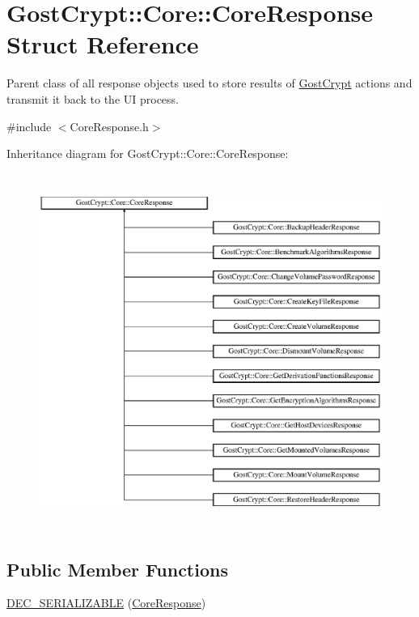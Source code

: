 \hypertarget{struct_gost_crypt_1_1_core_1_1_core_response}{}\section{Gost\+Crypt\+:\+:Core\+:\+:Core\+Response Struct Reference}
\label{struct_gost_crypt_1_1_core_1_1_core_response}


Parent class of all response objects used to store results of \hyperlink{namespace_gost_crypt}{Gost\+Crypt} actions and transmit it back to the UI process.  




{\ttfamily \#include $<$Core\+Response.\+h$>$}

Inheritance diagram for Gost\+Crypt\+:\+:Core\+:\+:Core\+Response\+:\begin{figure}[H]
\begin{center}
\leavevmode
\includegraphics[height=11.666667cm]{struct_gost_crypt_1_1_core_1_1_core_response}
\end{center}
\end{figure}
\subsection*{Public Member Functions}
\begin{DoxyCompactItemize}
\item 
\hyperlink{struct_gost_crypt_1_1_core_1_1_core_response_a689f4e914d5e1a18b2c4cc7d9a0753de}{D\+E\+C\+\_\+\+S\+E\+R\+I\+A\+L\+I\+Z\+A\+B\+LE} (\hyperlink{struct_gost_crypt_1_1_core_1_1_core_response}{Core\+Response})
\end{DoxyCompactItemize}
